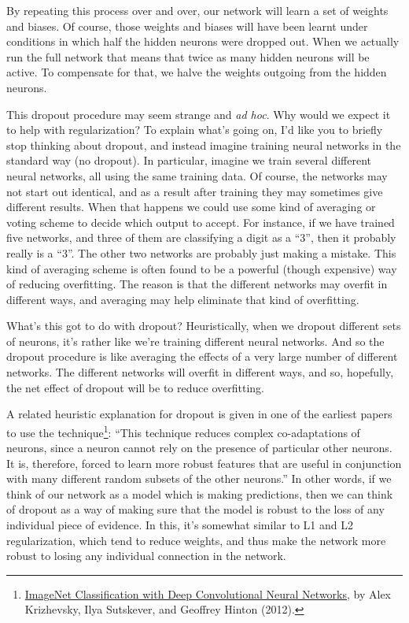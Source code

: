 \documentclass[a4paper,twoside,10pt]{book}
\begin{document}
By repeating this process over and over, our network will learn a set of weights and biases. Of course, those weights and biases will have been learnt under conditions in which half the hidden neurons were dropped out. When we actually run the full network that means that twice as many hidden neurons will be active. To compensate for that, we halve the weights outgoing from the hidden neurons.

This dropout procedure may seem strange and \textit{ad hoc}. Why would we expect it to help with regularization? To explain what's going on, I'd like you to briefly stop thinking about dropout, and instead imagine training neural networks in the standard way (no dropout). In particular, imagine we train several different neural networks, all using the same training data. Of course, the networks may not start out identical, and as a result after training they may sometimes give different results. When that happens we could use some kind of averaging or voting scheme to decide which output to accept. For instance, if we have trained five networks, and three of them are classifying a digit as a ``3'', then it probably really is a ``3''. The other two networks are probably just making a mistake. This kind of averaging scheme is often found to be a powerful (though expensive) way of reducing overfitting. The reason is that the different networks may overfit in different ways, and averaging may help eliminate that kind of overfitting.

What's this got to do with dropout? Heuristically, when we dropout different sets of neurons, it's rather like we're training different neural networks. And so the dropout procedure is like averaging the effects of a very large number of different networks. The different networks will overfit in different ways, and so, hopefully, the net effect of dropout will be to reduce overfitting.


A related heuristic explanation for dropout is given in one of the earliest papers to use the technique\footnote{\href{https://papers.nips.cc/paper/4824-imagenet-classification-with-deep-convolutional-neural-networks.pdf}{ImageNet Classification with Deep Convolutional Neural Networks}, by Alex Krizhevsky, Ilya Sutskever, and Geoffrey Hinton (2012).}: ``This technique reduces complex co-adaptations of neurons, since a neuron cannot rely on the presence of particular other neurons. It is, therefore, forced to learn more robust features that are useful in conjunction with many different random subsets of the other neurons.'' In other words, if we think of our network as a model which is making predictions, then we can think of dropout as a way of making sure that the model is robust to the loss of any individual piece of evidence. In this, it's somewhat similar to L1 and L2 regularization, which tend to reduce weights, and thus make the network more robust to losing any individual connection in the network.
\end{document}
